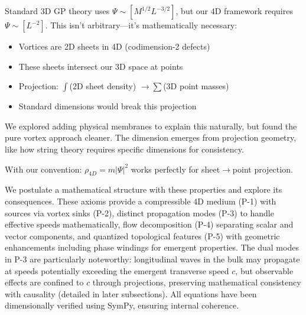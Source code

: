 \begin{tcolorbox}[title={Why $\Psi \sim [L^{-2}]$: A Geometric Necessity}]
Standard 3D GP theory uses $\Psi \sim [M^{1/2} L^{-3/2}]$, but our 4D framework requires $\Psi \sim [L^{-2}]$. This isn't arbitrary---it's mathematically necessary:

\begin{itemize}
\item Vortices are 2D sheets in 4D (codimension-2 defects)
\item These sheets intersect our 3D space at points
\item Projection: $\int$(2D sheet density) $\to \sum$(3D point masses)
\item Standard dimensions would break this projection
\end{itemize}

We explored adding physical membranes to explain this naturally, but found the pure vortex approach cleaner. The dimension emerges from projection geometry, like how string theory requires specific dimensions for consistency.

With our convention: $\rho_{4D} = m |\Psi|^2$ works perfectly for sheet$\to$point projection.
\end{tcolorbox}

We postulate a mathematical structure with these properties and explore its consequences. These axioms provide a compressible 4D medium (P-1) with sources via vortex sinks (P-2), distinct propagation modes (P-3) to handle effective speeds mathematically, flow decomposition (P-4) separating scalar and vector components, and quantized topological features (P-5) with geometric enhancements including phase windings for emergent properties. The dual modes in P-3 are particularly noteworthy: longitudinal waves in the bulk may propagate at speeds potentially exceeding the emergent transverse speed $c$, but observable effects are confined to $c$ through projections, preserving mathematical consistency with causality (detailed in later subsections). All equations have been dimensionally verified using SymPy, ensuring internal coherence.

